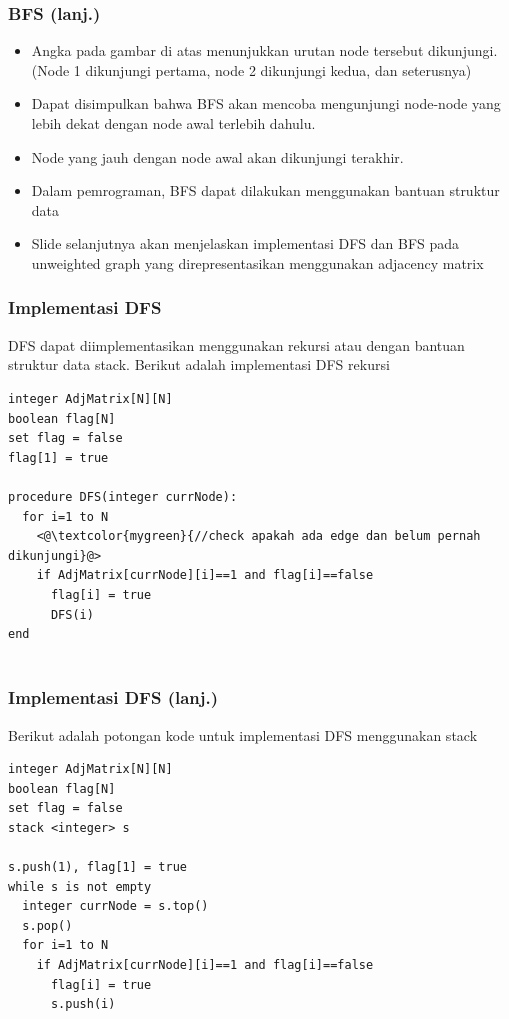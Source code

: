 \begin{frame}
\frametitle{BFS (lanj.)}
\begin{itemize}
  \item Angka pada gambar di atas menunjukkan urutan node tersebut dikunjungi. (Node 1 dikunjungi pertama, node 2 dikunjungi kedua, dan seterusnya)
  \item Dapat disimpulkan bahwa BFS akan mencoba mengunjungi node-node yang lebih dekat dengan node awal terlebih dahulu.
  \item Node yang jauh dengan node awal akan dikunjungi terakhir.
  \item Dalam pemrograman, BFS dapat dilakukan menggunakan bantuan struktur data 
  \item Slide selanjutnya akan menjelaskan implementasi DFS dan BFS pada unweighted graph yang direpresentasikan menggunakan adjacency matrix
\end{itemize}
\end{frame}

\begin{frame}[fragile]
\frametitle{Implementasi DFS}
DFS dapat diimplementasikan menggunakan rekursi atau dengan bantuan struktur data stack. Berikut adalah implementasi DFS rekursi\newline
\begin{lstlisting}
integer AdjMatrix[N][N]
boolean flag[N]
set flag = false
flag[1] = true

procedure DFS(integer currNode):
  for i=1 to N
    <@\textcolor{mygreen}{//check apakah ada edge dan belum pernah dikunjungi}@>
    if AdjMatrix[currNode][i]==1 and flag[i]==false
      flag[i] = true
      DFS(i)
end
        
\end{lstlisting}
\end{frame}

\begin{frame}[fragile]
\frametitle{Implementasi DFS (lanj.)}
Berikut adalah potongan kode untuk implementasi DFS menggunakan stack\newline
\begin{lstlisting}
integer AdjMatrix[N][N]
boolean flag[N]
set flag = false
stack <integer> s

s.push(1), flag[1] = true
while s is not empty
  integer currNode = s.top()
  s.pop()
  for i=1 to N
    if AdjMatrix[currNode][i]==1 and flag[i]==false
      flag[i] = true
      s.push(i)
        
\end{lstlisting}
\end{frame}

